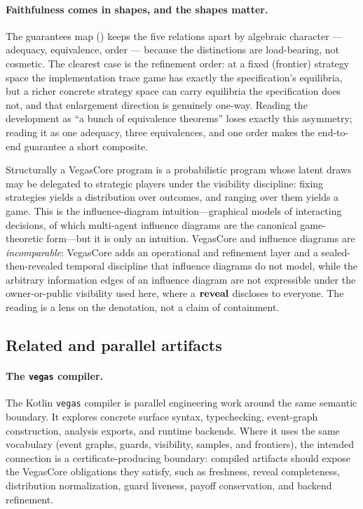 \paragraph{Faithfulness comes in shapes, and the shapes matter.}
The guarantees map () keeps the five
relations apart by algebraic character --- adequacy, equivalence, order ---
because the distinctions are load-bearing, not cosmetic.  The clearest case is
the refinement order: at a fixed (frontier) strategy space the implementation
trace game has exactly the specification's equilibria, but a richer concrete
strategy space can carry equilibria the specification does not, and that
enlargement direction is genuinely one-way.  Reading the development as ``a
bunch of equivalence theorems'' loses exactly this asymmetry; reading it as one
adequacy, three equivalences, and one order makes the end-to-end guarantee a
short composite.

\begin{remark}
Structurally a VegasCore program is a probabilistic program whose latent
draws may be delegated to strategic players under the visibility discipline:
fixing strategies yields a distribution over outcomes, and ranging over them
yields a game.  This is the influence-diagram intuition---graphical models
of interacting decisions, of which multi-agent influence diagrams
\citep{koller2003multi} are the canonical game-theoretic form---but it is
only an intuition.  VegasCore and influence diagrams are \emph{incomparable}:
VegasCore adds an operational and refinement layer and a
sealed-then-revealed temporal discipline that influence diagrams do not
model, while the arbitrary information edges of an influence diagram are not
expressible under the owner-or-public visibility used here, where a
\(\mathbf{reveal}\) discloses to everyone.  The reading is a lens on the denotation,
not a claim of containment.
\end{remark}

\subsection{Related and parallel artifacts}
\label{sec:disc:related-artifacts}

\paragraph{The \texttt{vegas} compiler.}
The Kotlin \texttt{vegas} compiler is parallel engineering work around
the same semantic boundary.  It explores concrete surface syntax,
typechecking, event-graph construction, analysis exports, and runtime
backends.  Where it uses the same vocabulary (event graphs, guards,
visibility, samples, and frontiers), the intended connection is a
certificate-producing boundary: compiled artifacts should expose the
VegasCore obligations they satisfy, such as freshness, reveal
completeness, distribution normalization, guard liveness, payoff
conservation, and backend refinement.

